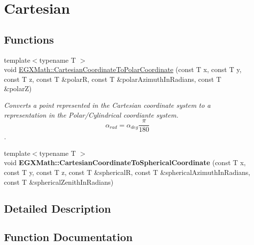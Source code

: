\hypertarget{group___e_g_x_math-_conversions-_coordinate_conversions-_cartesian}{}\section{Cartesian}
\label{group___e_g_x_math-_conversions-_coordinate_conversions-_cartesian}
\subsection*{Functions}
\begin{DoxyCompactItemize}
\item 
{\footnotesize template$<$typename T $>$ }\\void \mbox{\hyperlink{group___e_g_x_math-_conversions-_coordinate_conversions-_cartesian_gad0cea30328fa60ba74a8faa2f4ebb73f}{E\+G\+X\+Math\+::\+Cartesian\+Coordinate\+To\+Polar\+Coordinate}} (const T x, const T y, const T z, const T \&polarR, const T \&polar\+Azimuth\+In\+Radians, const T \&polarZ)
\begin{DoxyCompactList}\small\item\em Converts a point represented in the Cartesian coordinate system to a representation in the Polar/\+Cylindrical coordiante system. \[\alpha_{rad}=\alpha_{deg}\frac{\pi}{180}\]. \end{DoxyCompactList}\item 
\mbox{\label{group___e_g_x_math-_conversions-_coordinate_conversions-_cartesian_ga849c93ec135e9c72c5320c48eeacc7c9}} 
{\footnotesize template$<$typename T $>$ }\\void {\bfseries E\+G\+X\+Math\+::\+Cartesian\+Coordinate\+To\+Spherical\+Coordinate} (const T x, const T y, const T z, const T \&sphericalR, const T \&spherical\+Azimuth\+In\+Radians, const T \&spherical\+Zenith\+In\+Radians)
\end{DoxyCompactItemize}


\subsection{Detailed Description}


\subsection{Function Documentation}
\mbox{\label{group___e_g_x_math-_conversions-_coordinate_conversions-_cartesian_gad0cea30328fa60ba74a8faa2f4ebb73f}} 
